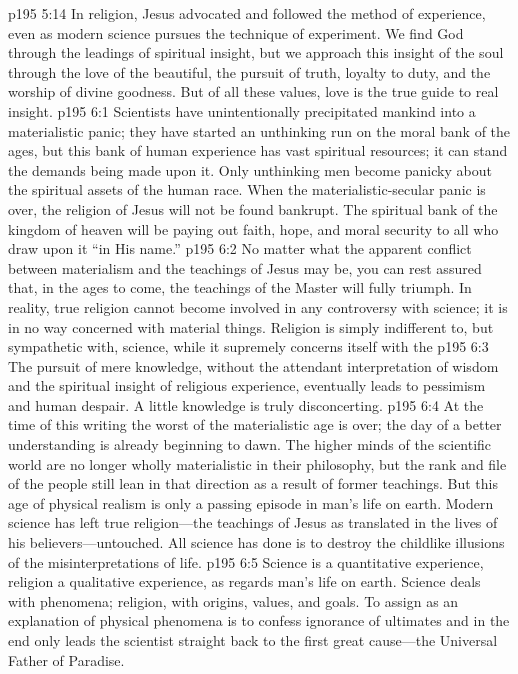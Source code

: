 \pc \vs p195 5:14 In religion, Jesus advocated and followed the method of experience, even as modern science pursues the technique of experiment. We find God through the leadings of spiritual insight, but we approach this insight of the soul through the love of the beautiful, the pursuit of truth, loyalty to duty, and the worship of divine goodness. But of all these values, love is the true guide to real insight.\plusone
{}
\vs p195 6:1 Scientists have unintentionally precipitated mankind into a materialistic panic; they have started an unthinking run on the moral bank of the ages, but this bank of human experience has vast spiritual resources; it can stand the demands being made upon it. Only unthinking men become panicky about the spiritual assets of the human race. When the materialistic\hyp{}secular panic is over, the religion of Jesus will not be found bankrupt. The spiritual bank of the kingdom of heaven will be paying out faith, hope, and moral security to all who draw upon it “in His name.”
\vs p195 6:2 No matter what the apparent conflict between materialism and the teachings of Jesus may be, you can rest assured that, in the ages to come, the teachings of the Master will fully triumph. In reality, true religion cannot become involved in any controversy with science; it is in no way concerned with material things. Religion is simply indifferent to, but sympathetic with, science, while it supremely concerns itself with the 
\vs p195 6:3 The pursuit of mere knowledge, without the attendant interpretation of wisdom and the spiritual insight of religious experience, eventually leads to pessimism and human despair. A little knowledge is truly disconcerting.
\vs p195 6:4 At the time of this writing the worst of the materialistic age is over; the day of a better understanding is already beginning to dawn. The higher minds of the scientific world are no longer wholly materialistic in their philosophy, but the rank and file of the people still lean in that direction as a result of former teachings. But this age of physical realism is only a passing episode in man’s life on earth. Modern science has left true religion---the teachings of Jesus as translated in the lives of his believers---untouched. All science has done is to destroy the childlike illusions of the misinterpretations of life.
\vs p195 6:5 Science is a quantitative experience, religion a qualitative experience, as regards man’s life on earth. Science deals with phenomena; religion, with origins, values, and goals. To assign  as an explanation of physical phenomena is to confess ignorance of ultimates and in the end only leads the scientist straight back to the first great cause---the Universal Father of Paradise.
